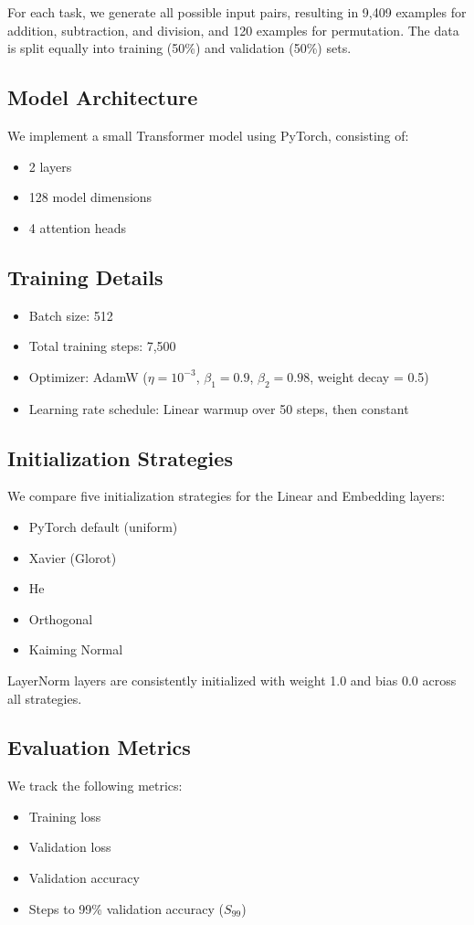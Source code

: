 \documentclass{article} %
\begin{document}
For each task, we generate all possible input pairs, resulting in 9,409 examples for addition, subtraction, and division, and 120 examples for permutation. The data is split equally into training (50\%) and validation (50\%) sets.

\subsection{Model Architecture}
We implement a small Transformer model using PyTorch, consisting of:
\begin{itemize}
    \item 2 layers
    \item 128 model dimensions
    \item 4 attention heads
\end{itemize}

\subsection{Training Details}
\begin{itemize}
    \item Batch size: 512
    \item Total training steps: 7,500
    \item Optimizer: AdamW ($\eta = 10^{-3}$, $\beta_1 = 0.9$, $\beta_2 = 0.98$, weight decay = 0.5)
    \item Learning rate schedule: Linear warmup over 50 steps, then constant
\end{itemize}

\subsection{Initialization Strategies}
We compare five initialization strategies for the Linear and Embedding layers:
\begin{itemize}
    \item PyTorch default (uniform)
    \item Xavier (Glorot)
    \item He
    \item Orthogonal
    \item Kaiming Normal
\end{itemize}
LayerNorm layers are consistently initialized with weight 1.0 and bias 0.0 across all strategies.

\subsection{Evaluation Metrics}
We track the following metrics:
\begin{itemize}
    \item Training loss
    \item Validation loss
    \item Validation accuracy
    \item Steps to 99\% validation accuracy ($S_{99}$)
\end{itemize}
\end{document}
